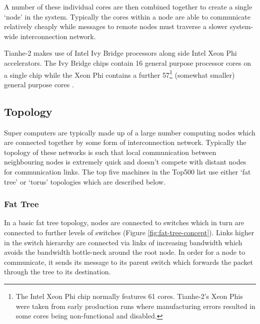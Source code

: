 			A number of these individual cores are then combined together to create a
			single `node' in the system. Typically the cores within a node are able to
			communicate relatively cheaply while messages to remote nodes must
			traverse a slower system-wide interconnection network.
			
			Tianhe-2 makes use of Intel Ivy Bridge processors along side Intel Xeon
			Phi accelerators. The Ivy Bridge chips contain 16 general purpose
			processor cores on a single chip while the Xeon Phi contains a further
			57\footnote{The Intel Xeon Phi chip normally features 61 cores. Tianhe-2's
			Xeon Phis were taken from early production runs where manufacturing errors
			resulted in some cores being non-functional and disabled.} (somewhat
			smaller) general purpose cores \cite{dongarra13}.
			
		
		\subsection{Topology}
			
			
			Super computers are typically made up of a large number computing nodes
			which are connected together by some form of interconnection network.
			Typically the topology of these networks is such that local communication
			between neighbouring nodes is extremely quick and doesn't compete with
			distant nodes for communication links. The top five machines in the
			Top500 list use either `fat tree' or `torus' topologies which are
			described below.
			
			\subsubsection{Fat Tree}
			
				In a basic fat tree topology, nodes are connected to switches which in
				turn are connected to further levels of switches (Figure
				\ref{fig:fat-tree-concept}). Links higher in the switch hierarchy are
				connected via links of increasing bandwidth which avoids the bandwidth
				bottle-neck around the root node. In order for a node to communicate, it
				sends its message to its parent switch which forwards the packet through
				the tree to its destination.
				
